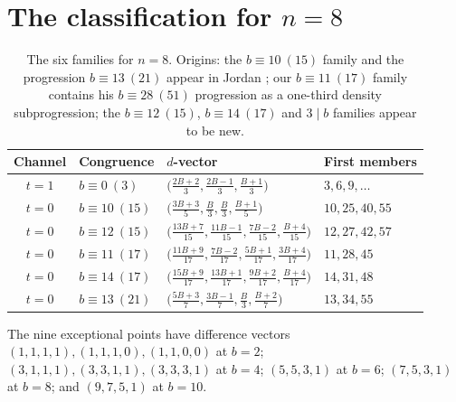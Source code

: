 \documentclass[11pt]{amsart}
\theoremstyle{definition}
\begin{document}
\section{The classification for \texorpdfstring{$n=8$}{n=8}}

\begin{table}[ht]
\caption{The six families for $n=8$. Origins: the $b\equiv10\ (15)$
family and the progression $b\equiv13\ (21)$ appear in Jordan
\cite{Jordan64}; our $b\equiv11\ (17)$ family contains his
$b\equiv28\ (51)$ progression as a one-third density subprogression;
the $b\equiv12\ (15)$, $b\equiv14\ (17)$ and $3\mid b$ families appear
to be new.}\label{tab:n8}
\begin{tabular}{clll}
\toprule
Channel & Congruence & $d$-vector & First members \\
\midrule
$t=1$ & $b\equiv 0\ (3)$ & $\bigl(\tfrac{2B+2}{3},\tfrac{2B-1}{3},\tfrac{B+1}{3}\bigr)$ & $3,6,9,\dots$ \\
$t=0$ & $b\equiv 10\ (15)$ & $\bigl(\tfrac{3B+3}{5},\tfrac{B}{3},\tfrac{B}{3},\tfrac{B+1}{5}\bigr)$ & $10,25,40,55$ \\
$t=0$ & $b\equiv 12\ (15)$ & $\bigl(\tfrac{13B+7}{15},\tfrac{11B-1}{15},\tfrac{7B-2}{15},\tfrac{B+4}{15}\bigr)$ & $12,27,42,57$ \\
$t=0$ & $b\equiv 11\ (17)$ & $\bigl(\tfrac{11B+9}{17},\tfrac{7B-2}{17},\tfrac{5B+1}{17},\tfrac{3B+4}{17}\bigr)$ & $11,28,45$ \\
$t=0$ & $b\equiv 14\ (17)$ & $\bigl(\tfrac{15B+9}{17},\tfrac{13B+1}{17},\tfrac{9B+2}{17},\tfrac{B+4}{17}\bigr)$ & $14,31,48$ \\
$t=0$ & $b\equiv 13\ (21)$ & $\bigl(\tfrac{5B+3}{7},\tfrac{3B-1}{7},\tfrac{B}{3},\tfrac{B+2}{7}\bigr)$ & $13,34,55$ \\
\bottomrule
\end{tabular}
\end{table}

The nine exceptional points have difference vectors
$(1,1,1,1),(1,1,1,0),(1,1,0,0)$ at $b=2$;
$(3,1,1,1),(3,3,1,1),(3,3,3,1)$ at $b=4$; $(5,5,3,1)$ at $b=6$;
$(7,5,3,1)$ at $b=8$; and $(9,7,5,1)$ at $b=10$.
\end{document}
